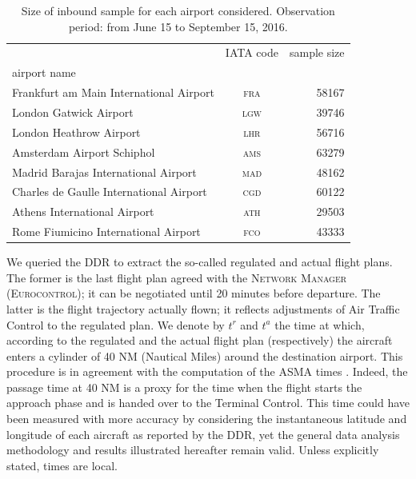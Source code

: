 \documentclass[draft,review]{elsarticle}
\newcommand{\airp}[1]{\textcolor{#1}{\textsc{#1}}}
\begin{document}
\begin{table}[tbp]
  \caption{Size of inbound sample for each airport considered. Observation period: from June 15 to September 15, 2016.}\label{tab:flights_count}
    \begin{tabular}{lcr}
      \toprule
      {} & \acs{IATA} code &  sample size \\
      airport name                                       &                 &              \\
      \midrule
      Frankfurt am Main International Airport &     \airp{fra} &        58167 \\
      London Gatwick Airport                  &     \airp{lgw} &        39746 \\
      London Heathrow Airport                 &     \airp{lhr} &        56716 \\
      Amsterdam Airport Schiphol              &     \airp{ams} &        63279 \\
      Madrid Barajas International Airport    &     \airp{mad} &        48162 \\
      Charles de Gaulle International Airport &     \airp{cgd} &        60122 \\
      Athens International Airport            &     \airp{ath} &        29503 \\
      Rome Fiumicino International Airport    &     \airp{fco} &        43333 \\
      \bottomrule
    \end{tabular}
\end{table}

We queried the \ac{DDR} to extract the so-called regulated and actual flight plans.
The former is the last flight plan agreed with the \textsc{Network Manager (Eurocontrol)}; it can be negotiated until 20 minutes before departure. The latter is the flight trajectory actually flown; it reflects adjustments of Air Traffic Control to the regulated plan.
We denote by \(t^r\) and \(t^a\) the time at which, according to the regulated and the actual flight plan (respectively) the aircraft enters a cylinder of 40 NM (Nautical Miles) around the destination airport.
This procedure is in agreement with the computation of the \ac{ASMA} times \citep{ASMA-def}.
Indeed, the passage time at 40 NM is a proxy for the time when the flight starts the approach phase and is handed over to the Terminal Control.
This time could have been measured with more accuracy by considering the instantaneous latitude and longitude of each aircraft as reported by the \ac{DDR}, yet the general data analysis methodology and results illustrated hereafter remain valid.
Unless explicitly stated, times are local.
\end{document}
